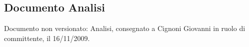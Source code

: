 \subsection{Documento Analisi}
Documento non versionato: Analisi, consegnato a Cignoni Giovanni in ruolo di committente, il 16/11/2009.

